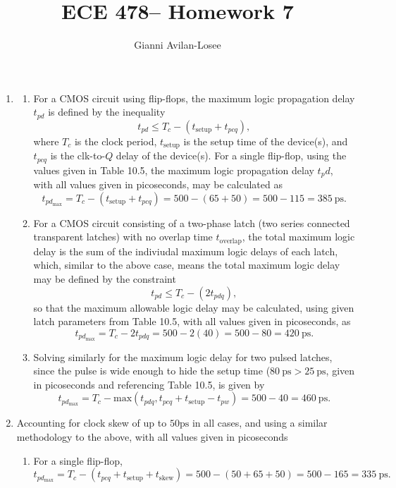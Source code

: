 \documentclass{article}
\title{ECE 478-- Homework 7}
\author{Gianni Avilan-Losee}
\begin{document}
\setcounter{section}{10}
\setcounter{subsection}{1}
\begin{enumerate}[label=\thesubsection]
	\item
\begin{enumerate}[label=\alph*)]
	\item For a CMOS circuit using flip-flops, the maximum logic propagation delay \(t_{pd}\) is defined by the inequality 
		\[
			t_{pd} \leq T_c - (t_{\mathrm{setup}} + t_{pcq}),
		\]
		where \(T_c\) is the clock period, \(t_{\mathrm{setup}}\) is the setup time of the device(s), and \(t_{pcq}\) is the clk-to-\(Q\) delay of the device(s). 
		For a single flip-flop, using the values given in Table 10.5, the maximum logic propagation delay \(t_pd\), with all values given in picoseconds, may be calculated as 
		\[
			t_{pd_{\mathrm{max}}} = T_c - (t_{\mathrm{setup}} + t_{pcq}) = 500 - (65 + 50) = 500 - 115 = 385 \ \mathrm{ps}.
		\]
	\item For a CMOS circuit consisting of a two-phase latch (two series connected transparent latches) with no overlap time \(t_{\mathrm{overlap}}\), the total maximum logic delay is the sum of the indiviudal maximum logic delays of each latch, which, similar to the above case, means the total maximum logic delay may be defined by the constraint
		\[
			t_{pd} \leq T_{c} - (2t_{pdq}),
		\]
		so that the maximum allowable logic delay may be calculated, using given latch parameters from Table 10.5, with all values given in picoseconds, as
		\[
			t_{pd_{\mathrm{max}}} = T_c - 2t_{pdq} = 500 - 2(40) = 500-80 = 420 \ \mathrm{ps}.
		\]
	\item Solving similarly for the maximum logic delay for two pulsed latches, since the pulse is wide enough to hide the setup time (\(80 \ \mathrm{ps} > 25 \ \mathrm{ps}\), given in picoseconds and referencing Table 10.5, is given by
		\[
			t_{pd_{\mathrm{max}}} = T_c - \mathrm{max}\left(t_{pdq}, t_{pcq} + t_{\mathrm{setup}}-t_{pw}\right) = 500 - 40 = 460 \ \mathrm{ps}.
		\]
\end{enumerate}
\setcounter{subsection}{2}
\item Accounting for clock skew of up to \(50 \mathrm{ps}\) in all cases, and using a similar methodology to the above, with all values given in picoseconds
	\begin{enumerate}[label=\alph*)]
		\item For a single flip-flop,
			\[
				t_{pd_{\mathrm{max}}} = T_c - (t_{pcq} + t_{\mathrm{setup}} + t_{\mathrm{skew}}) = 500 - (50 + 65 + 50) = 500 - 165 = 335 \ \mathrm{ps}.
			\]

\end{enumerate}
\end{enumerate}
\end{document}
